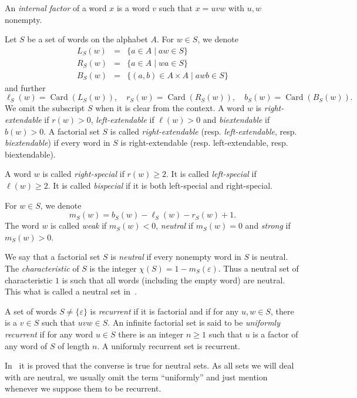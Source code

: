 \documentclass[preprint,12pt]{elsarticle}
\DeclareMathOperator{\Card}{Card}
\numberwithin{theorem}{section}
\numberwithin{equation}{section}
\numberwithin{figure}{section}
\numberwithin{table}{section}
\begin{document}
An \emph{internal factor} of a word $x$ is a word $v$ such that $x=uvw$ with $u,w$ nonempty.

Let $S$ be a  set of words on the alphabet $A$.
For $w\in S$, we denote
\begin{eqnarray*}
L_S(w) &=& \{a\in A\mid aw\in S\}\\
R_S(w) &=& \{a\in A\mid wa\in S\}\\
B_S(w) &=& \{(a,b)\in A\times A \mid awb\in S\}
\end{eqnarray*}
and further
\begin{displaymath}
\ell_S(w)=\Card(L_S(w)),\quad r_S(w)=\Card(R_S(w)),\quad b_S(w)=\Card(B_S(w)).
\end{displaymath}
We omit the subscript $S$ when it is clear from the context.
A word $w$ is \emph{right-extendable} if $r(w)>0$,
\emph{left-extendable} if $\ell(w)>0$ and \emph{biextendable} if
$b(w)>0$. A 
factorial set
$S$ is called \emph{right-extendable}
(resp. \emph{left-extendable}, resp. \emph{biextendable}) if every word in $S$ is
right-extendable (resp. left-extendable, resp. biextendable).

A word $w$ is called \emph{right-special} if $r(w)\ge 2$. 
It is called \emph{left-special} if $\ell(w)\ge 2$. 
It is called \emph{bispecial} if it is
both left-special and right-special.

For $w\in S$, we denote 
\begin{displaymath}
m_S(w) = b_S(w)-\ell_S(w)-r_S(w)+1.
\end{displaymath}
The word $w$ is called \emph{weak} if $m_S(w)<0$, \emph{neutral} if $m_S(w)=0$ and \emph{strong} if $m_S(w)>0$.

We say that a factorial set $S$ is \emph{neutral} if every nonempty word in $S$ is neutral.
The \emph{characteristic} of $S$ is the integer $\chi(S)=1-m_S(\varepsilon)$.
Thus a neutral set of characteristic $1$ is such that all words (including the empty word) are neutral. This what is called a neutral
set in~\cite{BertheDeFeliceDolceLeroyPerrinReutenauerRindone2013a}.

A set of words $S\ne\{\varepsilon\}$ is \emph{recurrent} if it is factorial and if for any $u,w \in S$, there is a $v \in S$ such that $uvw \in S$.
An infinite factorial set is said to be \emph{uniformly recurrent} if for any word $u\in S$ there is an integer $n \geq 1$ such that $u$ is a factor of any word of $S$ of length $n$.
A uniformly recurrent set is recurrent.

In~\cite{DolcePerrin2016} it is proved that the converse is true for neutral sets.
As all sets we will deal with are neutral, we usually omit the term ``uniformly'' and just mention whenever we suppose them to be recurrent.
\end{document}
